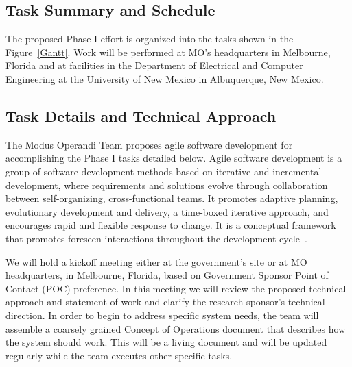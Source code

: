 \documentclass{sbir}
\begin{document}
\subsection{Task Summary and Schedule}
The proposed Phase I effort is organized into the tasks shown in the Figure~\ref{Gantt}. Work will be performed at MO's headquarters in Melbourne, Florida and at facilities in the Department of Electrical and Computer Engineering at the University of New Mexico in Albuquerque, New Mexico.

\begin{center}
\end{center}

\subsection{Task Details and Technical Approach}
The Modus Operandi Team proposes agile software development for accomplishing the Phase I tasks detailed below. Agile software development is a group of software development methods based on iterative and incremental development, where requirements and solutions evolve through collaboration between self-organizing, cross-functional teams. It promotes adaptive planning, evolutionary development and delivery, a time-boxed iterative approach, and encourages rapid and flexible response to change. It is a conceptual framework that promotes foreseen interactions throughout the development cycle~\cite{La:03}.

We will hold a kickoff meeting either at the government's site or at MO headquarters, in Melbourne, Florida, based on Government Sponsor Point of Contact (POC) preference. In this meeting we will review the proposed technical approach and statement of work and clarify the research sponsor's technical direction. In order to begin to address specific system needs, the team will assemble a coarsely grained Concept of Operations document that describes how the system should work. This will be a living document and will be updated regularly while the team executes other specific tasks. 
\end{document}
